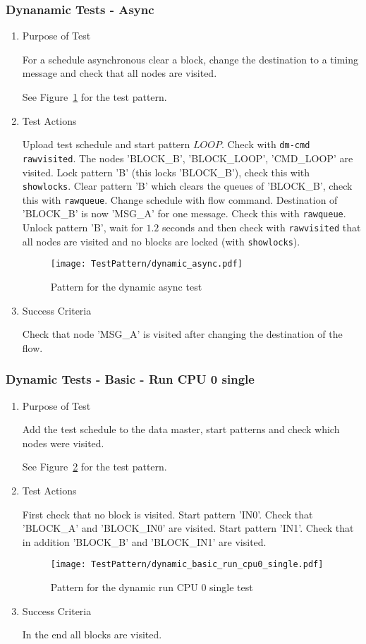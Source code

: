 \subsubsection{Dynanamic Tests - Async}
\begin{enumerate}
	\item Purpose of Test

	For a schedule asynchronous clear a block, change the destination to a timing message and check that all nodes are visited.

	See Figure~\ref{fig:Pattern_for_the_dynamic_async_test} for the test pattern.
	\item Test Actions

	Upload test schedule and start pattern $LOOP$. Check with \texttt{dm-cmd rawvisited}. The 
	nodes 'BLOCK\_B', 'BLOCK\_LOOP', 'CMD\_LOOP' are visited. Lock pattern 'B' (this locks 'BLOCK\_B'), check this with 
	\texttt{showlocks}. Clear pattern 'B' which clears the queues of 'BLOCK\_B', check this with \texttt{rawqueue}. 
	Change schedule with flow command. Destination of 'BLOCK\_B' is now 'MSG\_A' for one message. Check this 
	with \texttt{rawqueue}. Unlock pattern 'B', wait for $1.2$ seconds and then check with \texttt{rawvisited} that all 
	nodes are visited and no blocks are locked (with \texttt{showlocks}).
    \begin{figure}
        \centering 
        \texttt{[image: TestPattern/dynamic\_async.pdf]}
        \caption{Pattern for the dynamic async test}
        \label{fig:Pattern_for_the_dynamic_async_test}
    \end{figure}
	\item Success Criteria
	
	Check that node 'MSG\_A' is visited after changing the destination of the flow.
\end{enumerate}
\subsubsection{Dynamic Tests - Basic - Run CPU 0 single}
\begin{enumerate}
	\item Purpose of Test

    Add the test schedule to the data master, start patterns and check which nodes were visited.

	See Figure~\ref{fig:Pattern_for_the_dynamic_run_CPU_0_single_test} for the test pattern.
	\item Test Actions
    
    First check that no block is visited. Start pattern 'IN0'. Check that 'BLOCK\_A' and 'BLOCK\_IN0' are visited. 
    Start pattern 'IN1'. Check that in addition 'BLOCK\_B' and 'BLOCK\_IN1' are visited.
    \begin{figure}
        \centering 
        \texttt{[image: TestPattern/dynamic\_basic\_run\_cpu0\_single.pdf]}
        \caption{Pattern for the dynamic run CPU 0 single test}
        \label{fig:Pattern_for_the_dynamic_run_CPU_0_single_test}
    \end{figure}
	\item Success Criteria

	In the end all blocks are visited.
\end{enumerate}
